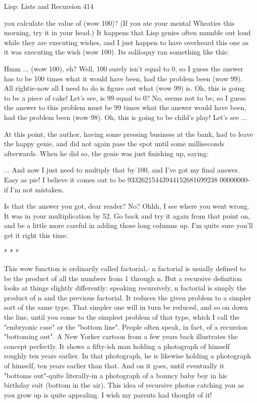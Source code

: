 Lisp: Lists and Recursion                                                             414

you calculate the value of (wow 100)? (If you ate your mental Wheaties this morning,
try it in your head.)
         It happens that Lisp genies often mumble out loud while they are executing
wishes, and I just happen to have overheard this one as it was executing the wish
(wow 100). Its soliloquy ran something like this:

            Hmm ... (wow 100), eh? Well, 100 surely isn't equal to 0, so I guess the
   answer has to be 100 times what it would have been, had the problem been
   (wow 99). All rightie-now all I need to do is figure out what (wow 99) is. Oh,
   this is going to be a piece of cake! Let's see, is 99 equal to 0? No, seems not to
   be, so I guess the answer to this problem must be 99 times what the answer
   would have been, had the problem been (wow 98). Oh, this is going to be child's
   play! Let's see ...

At this point, the author, having some pressing business at the bank, had to leave the
happy genie, and did not again pass the spot until some milliseconds afterwards.
When he did so, the genie was just finishing up, saying:

       ... And now I just need to multiply that by 100, and I've got my final answer.
       Easy as pie! I believe it comes out to be 93326215443944152681699238
       00000000-if I'm not mistaken.

Is that the answer you got, dear reader? No? Ohhh, I see where you went wrong. It
was in your multiplication by 52. Go back and try it again from that point on, and be a
little more careful in adding those long columns up. I'm quite sure you'll get it right
this time.

                                        *   *   *

        This wow function is ordinarily called factorial,- n factorial is usually defined
to be the product of all the numbers from 1 through n. But a recursive definition looks
at things slightly differently: speaking recursively, n factorial is simply the product of
n and the previous factorial. It reduces the given problem to a simpler sort of the same
type. That simpler one will in turn be reduced, and so on down the line, until you
come to the simplest problem of that type, which I call the "embryonic case" or the
"bottom line". People often speak, in fact, of a recursion "bottoming out".
        A New Yorker cartoon from a few years back illustrates the concept perfectly.
It shows a fifty-ish man holding a photograph of himself roughly ten years earlier. In
that photograph, he is likewise holding a photograph of himself, ten years earlier than
that. And on it goes, until eventually it "bottoms out"-quite literally-in a photograph
of a bouncy baby boy in his birthday suit (bottom in the air). This idea of recursive
photos catching you as you grow up is quite appealing. I wish my parents had thought
of it!




